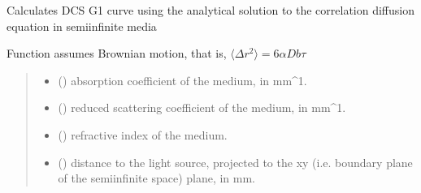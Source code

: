 \documentclass[letterpaper,10pt,english]{sphinxmanual}
\begin{document}
\begin{fulllineitems}
\label{\detokenize{_autosummary/nirfasterff.forward.analytical.semi_infinite_DCS:nirfasterff.forward.analytical.semi_infinite_DCS}}
\pysigstartsignatures
\pysiglinewithargsret
{}
{\sphinxparamcomma {}\sphinxparamcomma {}\sphinxparamcomma {}\sphinxparamcomma {}\sphinxparamcomma {}\sphinxparamcomma {}\sphinxparamcomma {}\sphinxparamcomma {}\sphinxparamcomma {}\sphinxparamcomma {}}
{}
\pysigstopsignatures
\sphinxAtStartPar
Calculates DCS G1 curve using the analytical solution to the correlation diffusion equation in semi\sphinxhyphen{}infinite media

\sphinxAtStartPar
Function assumes Brownian motion, that is, \(\langle\Delta r^2\rangle=6\alpha Db\tau\)
\begin{quote}\begin{description}
\begin{itemize}
\item {} 
\sphinxAtStartPar
{} () \textendash{} absorption coefficient of the medium, in mm\textasciicircum{}\sphinxhyphen{}1.

\item {} 
\sphinxAtStartPar
{} () \textendash{} reduced scattering coefficient of the medium, in mm\textasciicircum{}\sphinxhyphen{}1.

\item {} 
\sphinxAtStartPar
{} () \textendash{} refractive index of the medium.

\item {} 
\sphinxAtStartPar
{} () \textendash{} distance to the light source, projected to the x\sphinxhyphen{}y (i.e. boundary plane of the semi\sphinxhyphen{}infinite space) plane, in mm.


\end{itemize}
\end{description}
\end{quote}
\end{fulllineitems}
\end{document}

